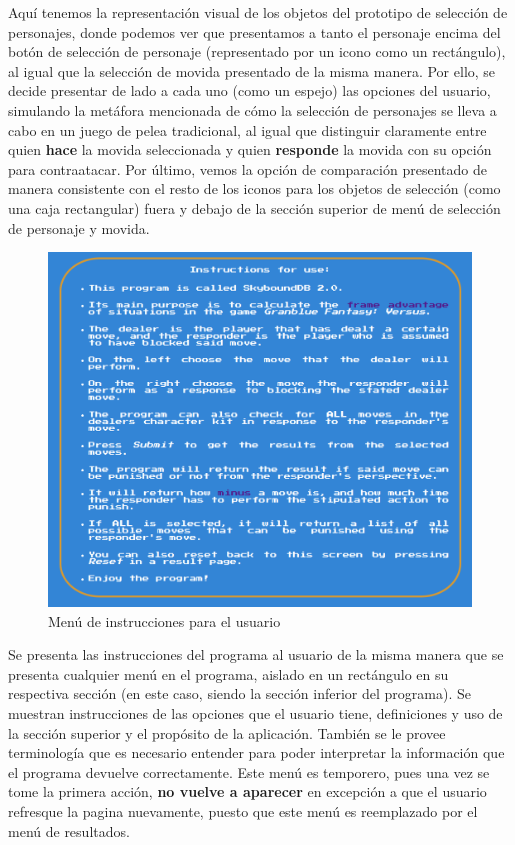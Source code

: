 \newpage
    Aquí tenemos la representación visual de los objetos del prototipo de selección de personajes, donde podemos ver que presentamos a tanto el personaje encima del botón de selección de personaje (representado por un icono como un rectángulo), al igual que la selección de movida presentado de la misma manera. Por ello, se decide presentar de lado a cada uno (como un espejo) las opciones del usuario, simulando la metáfora mencionada de cómo la selección de personajes se lleva a cabo en un juego de pelea tradicional, al igual que distinguir claramente entre quien \textbf{hace} la movida seleccionada y quien \textbf{responde} la movida con su  opción para contraatacar. Por último, vemos la opción de comparación presentado de manera consistente con el resto de los iconos para los objetos de selección (como una caja rectangular) fuera y debajo de la sección superior de menú de selección de personaje y movida.

\begin{center}
    \begin{figure}
        \centering
        \includegraphics[height=0.4\textheight]{figures/Instructions_menu-object.png}
        \caption{Menú de instrucciones para el usuario}
        \label{fig: ins prt}
    \end{figure}
\end{center}

\newpage
    Se presenta las instrucciones del programa al usuario de la misma manera que se presenta cualquier menú en el programa, aislado en un rectángulo en su respectiva sección (en este caso, siendo la sección inferior del programa). Se muestran instrucciones de las opciones que el usuario tiene, definiciones y uso de la sección superior y el propósito de la aplicación. También se le provee terminología que es necesario entender para poder interpretar la información que el programa devuelve correctamente. Este menú es temporero, pues una vez se tome la primera acción, \textbf{no vuelve a aparecer} en excepción a que el usuario refresque la pagina nuevamente, puesto que este menú es reemplazado por el menú de resultados.

